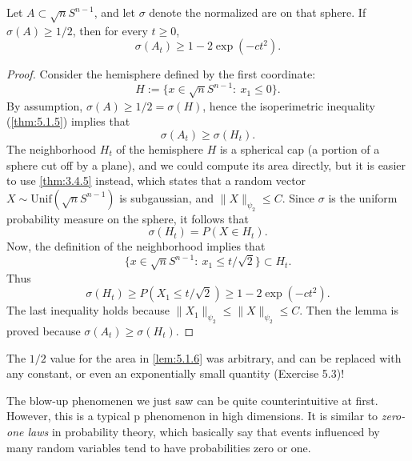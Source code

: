 \begin{lemma}[Blow-up]
\label{lem:5.1.6}
Let $A \subset \sqrt{n}S^{n - 1}$, and let $\sigma$ denote the normalized are on that sphere. If 
$\sigma(A) \geq 1/2$, then for every $t \geq 0$, 
\[ \sigma(A_t) \geq 1 - 2 \exp{(-ct^2)}. \]
\end{lemma}

\begin{proof}
Consider the hemisphere defined by the first coordinate:
\[ H := \{x \in \sqrt{n}S^{n - 1}: \ x_1 \leq 0 \}. \]
By assumption, $\sigma(A) \geq 1/2 = \sigma(H)$, hence the isoperimetric inequality (\cref{thm:5.1.5}) implies 
that 
\[ \sigma(A_t) \geq \sigma(H_t). \]
The neighborhood $H_t$ of the hemisphere $H$ is a spherical cap (a portion of a sphere cut off by a plane), 
and we could compute its area directly, but 
it is easier to use \cref{thm:3.4.5} instead, which states that a random vector $X \sim \mathrm{Unif}
(\sqrt{n}S^{n - 1})$ is subgaussian, and $\lVert X \rVert_{\psi_2} \leq C$. Since $\sigma$ is the uniform 
probability measure on the sphere, it follows that 
\[ \sigma(H_t) = P(X \in H_t). \]
Now, the definition of the neighborhood implies that 
\[ \{ x \in \sqrt{n}S^{n - 1}: \ x_1 \leq t / \sqrt{2} \} \subset H_t. \]
Thus
\[ \sigma(H_t) \geq P(X_1 \leq t / \sqrt{2}) \geq 1 - 2 \exp{(-ct^2)}. \]
The last inequality holds because $\lVert X_1 \rVert_{\psi_2} \leq \lVert X \rVert_{\psi_2} \leq C$. Then the 
lemma is proved because $\sigma(A_t) \geq \sigma(H_t)$.
\end{proof}

\begin{remark}
\label{rmk:5.1.7}
The $1/2$ value for the area in \cref{lem:5.1.6} was arbitrary, and can be replaced with any constant, or even 
an exponentially small quantity (Exercise 5.3)!
\end{remark}

\begin{remark}
\label{rmk:5.1.8}
The blow-up phenomenen we just saw can be quite counterintuitive at first. However, this is a typical p
phenomenon in high dimensions. It is similar to \textit{zero-one laws} in probability theory, which basically 
say that events influenced by many random variables tend to have probabilities zero or one.
\end{remark}


